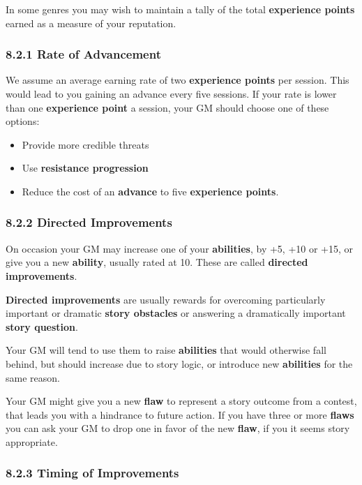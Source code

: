 \documentclass[
  11pt,
]{article}
\providecommand{\tightlist}{%
  \setlength{\itemsep}{0pt}\setlength{\parskip}{0pt}}
\begin{document}
In some genres you may wish to maintain a tally of the total
\textbf{experience points} earned as a measure of your reputation.

\hypertarget{rate-of-advancement}{%
\subsubsection{8.2.1 Rate of Advancement}\label{rate-of-advancement}}

We assume an average earning rate of two \textbf{experience points} per
session. This would lead to you gaining an advance every five sessions.
If your rate is lower than one \textbf{experience point} a session, your
GM should choose one of these options:

\begin{itemize}
\tightlist
\item
  Provide more credible threats
\item
  Use \textbf{resistance progression}
\item
  Reduce the cost of an \textbf{advance} to five \textbf{experience
  points}.
\end{itemize}

\hypertarget{directed-improvements}{%
\subsubsection{8.2.2 Directed
Improvements}\label{directed-improvements}}

On occasion your GM may increase one of your \textbf{abilities}, by +5,
+10 or +15, or give you a new \textbf{ability}, usually rated at 10.
These are called \textbf{directed improvements}.

\textbf{Directed improvements} are usually rewards for overcoming
particularly important or dramatic \textbf{story obstacles} or answering
a dramatically important \textbf{story question}.

Your GM will tend to use them to raise \textbf{abilities} that would
otherwise fall behind, but should increase due to story logic, or
introduce new \textbf{abilities} for the same reason.

Your GM might give you a new \textbf{flaw} to represent a story outcome
from a contest, that leads you with a hindrance to future action. If you
have three or more \textbf{flaws} you can ask your GM to drop one in
favor of the new \textbf{flaw}, if you it seems story appropriate.

\hypertarget{timing-of-improvements}{%
\subsubsection{8.2.3 Timing of
Improvements}\label{timing-of-improvements}}
\end{document}

